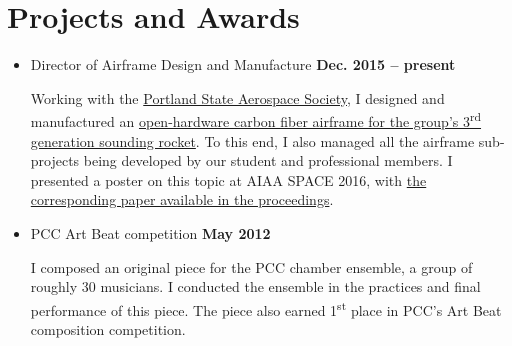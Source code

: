 \documentclass[letterpaper]{article}
\begin{document}
\section{Projects and Awards}
\begin{center}
\begin{itemize}
\item Director of Airframe Design and Manufacture
	\hfill\textbf{Dec. 2015 -- present} %
	\par Working with the \href{http://psas.pdx.edu/}{Portland State Aerospace Society}, I designed and manufactured an \href{https://github.com/psas/sw-cad-airframe-lv3.0}{open-hardware carbon fiber airframe for the group's 3\textsuperscript{rd} generation sounding rocket}. 
	To this end, I also managed all the airframe sub-projects being developed by our student and professional members. 
	I presented a poster on this topic at AIAA SPACE 2016, with \href{http://arc.aiaa.org/doi/pdf/10.2514/6.2016-5365}{the corresponding paper available in the proceedings}. 
\item PCC Art Beat competition \hfill\textbf{May 2012}
	\par I composed an original piece for the PCC chamber ensemble, a group of roughly 30 musicians. 
	I conducted the ensemble in the practices and final performance of this piece.
	The piece also earned 1\textsuperscript{st} place in PCC's Art Beat composition competition. 
\end{itemize}
\end{center}

\filbreak
\end{document}
